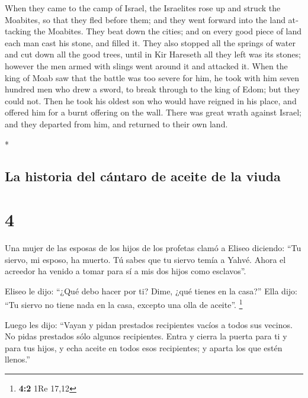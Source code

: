 \begin{paracol}{2}
\begin{otherlanguage}{english}
 When they came to the camp of Israel, the Israelites
rose up and struck the Moabites, so that they fled before them; and they
went forward into the land attacking the Moabites.  They
beat down the cities; and on every good piece of land each man cast his
stone, and filled it. They also stopped all the springs of water and cut
down all the good trees, until in Kir Hareseth all they left was its
stones; however the men armed with slings went around it and attacked
it.  When the king of Moab saw that the battle was too
severe for him, he took with him seven hundred men who drew a sword, to
break through to the king of Edom; but they could not. 
Then he took his oldest son who would have reigned in his place, and
offered him for a burnt offering on the wall. There was great wrath
against Israel; and they departed from him, and returned to their own
land.

\end{otherlanguage}

\switchcolumn[0]*

\hypertarget{la-historia-del-cuxe1ntaro-de-aceite-de-la-viuda}{%
\subsection{La historia del cántaro de aceite de la
viuda}\label{la-historia-del-cuxe1ntaro-de-aceite-de-la-viuda}}

\hypertarget{section-6}{%
\section{4}\label{section-6}}

 Una mujer de las esposas de los hijos de los profetas
clamó a Eliseo diciendo: ``Tu siervo, mi esposo, ha muerto. Tú sabes que
tu siervo temía a Yahvé. Ahora el acreedor ha venido a tomar para sí a
mis dos hijos como esclavos''.

 Eliseo le dijo: ``¿Qué debo hacer por ti? Dime, ¿qué
tienes en la casa?'' Ella dijo: ``Tu siervo no tiene nada en la casa,
excepto una olla de aceite''. \footnote{\textbf{4:2} 1Re 17,12}

 Luego les dijo: ``Vayan y pidan prestados recipientes
vacíos a todos sus vecinos. No pidas prestados sólo algunos recipientes.
 Entra y cierra la puerta para ti y para tus hijos, y echa
aceite en todos esos recipientes; y aparta los que estén llenos.''


\end{paracol}
